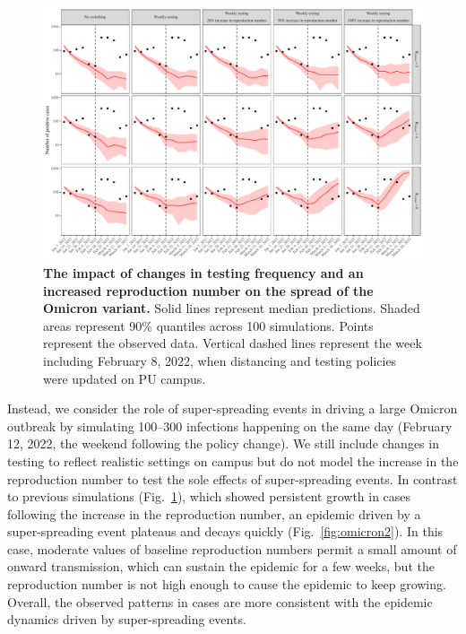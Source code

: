 \documentclass[12pt]{article}
\newcommand{\fref}[1]{Fig.~\ref{fig:#1}}
\begin{document}
\begin{figure}[!ht]
\includegraphics[width=\textwidth]{../figure_princeton_new/figure_princeton_simulation_omicron_spring.pdf}
\caption{
\textbf{The impact of changes in testing frequency and an increased reproduction number on the spread of the Omicron variant.}
Solid lines represent median predictions.
Shaded areas represent 90\% quantiles across 100 simulations.
Points represent the observed data.
Vertical dashed lines represent the week including February 8, 2022, when distancing and testing policies were updated on PU campus.
}
\label{fig:omicron1}
\end{figure}

Instead, we consider the role of super-spreading events in driving a large Omicron outbreak by simulating 100--300 infections happening on the same day (February 12, 2022, the weekend following the policy change).
We still include changes in testing to reflect realistic settings on campus but do not model the increase in the reproduction number to test the sole effects of super-spreading events.
In contrast to previous simulations (\fref{omicron1}), which showed persistent growth in cases following the increase in the reproduction number, an epidemic driven by a super-spreading event plateaus and decays quickly (\fref{omicron2}).
In this case, moderate values of baseline reproduction numbers permit a small amount of onward transmission, which can sustain the epidemic for a few weeks, but the reproduction number is not high enough to cause the epidemic to keep growing.
Overall, the observed patterns in cases are more consistent with the epidemic dynamics driven by super-spreading events.
\end{document}
